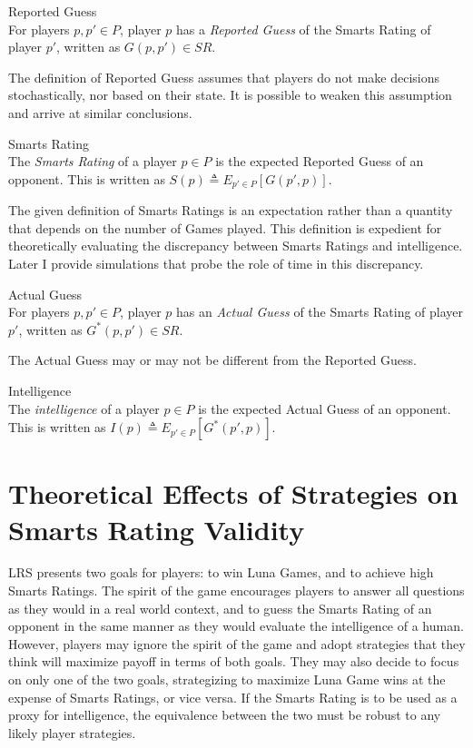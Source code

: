 \theoremstyle{definition}
\begin{definition}{Reported Guess}\\
For players $p, p' \in P$, player $p$ has a \textit{Reported Guess} of the Smarts Rating of player $p'$, written as $G(p, p') \in SR$.
\end{definition}

\noindent The definition of Reported Guess assumes that players do not make decisions stochastically, nor based on their state. It is possible to weaken this assumption and arrive at similar conclusions.

\theoremstyle{definition}
\begin{definition}{Smarts Rating}\\
The \textit{Smarts Rating} of a player $p \in P$ is the expected Reported Guess of an opponent. This is written as $S(p) \triangleq E_{p' \in P}[G(p', p)]$.
\end{definition}

\noindent The given definition of Smarts Ratings is an expectation rather than a quantity that depends on the number of Games played. This definition is expedient for theoretically evaluating the discrepancy between Smarts Ratings and intelligence. Later I provide simulations that probe the role of time in this discrepancy.

\theoremstyle{definition}
\begin{definition}{Actual Guess}\\
For players $p, p' \in P$, player $p$ has an \textit{Actual Guess} of the Smarts Rating of player $p'$, written as $G^*(p, p') \in SR$.
\end{definition}

\noindent The Actual Guess may or may not be different from the Reported Guess.

\theoremstyle{definition}
\begin{definition}{Intelligence}\\
The \textit{intelligence} of a player $p \in P$ is the expected Actual Guess of an opponent. This is written as $I(p) \triangleq E_{p' \in P}[G^*(p', p)]$.
\end{definition}

\section{Theoretical Effects of Strategies on Smarts Rating Validity}

LRS presents two goals for players: to win Luna Games, and to achieve high Smarts Ratings. The spirit of the game encourages players to answer all questions as they would in a real world context, and to guess the Smarts Rating of an opponent in the same manner as they would evaluate the intelligence of a human. However, players may ignore the spirit of the game and adopt strategies that they think will maximize payoff in terms of both goals. They may also decide to focus on only one of the two goals, strategizing to maximize Luna Game wins at the expense of Smarts Ratings, or vice versa. If the Smarts Rating is to be used as a proxy for intelligence, the equivalence between the two must be robust to any likely player strategies.

